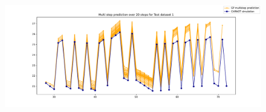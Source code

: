 \begin{figure}[ht]
    \centering
    \includegraphics[width =
    \textwidth]{Plots/SVGP_123_test_prediction_20_steps.pdf}
    \caption{}
    \label{fig:SVGP_multistep_validation}
\end{figure}

\clearpage
